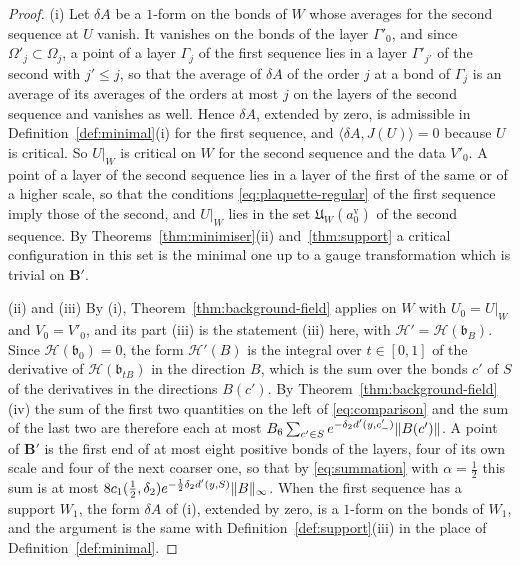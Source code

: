 \documentclass[11pt]{preprint}
\DeclarePairedDelimiter{\norm}{\lVert}{\rVert}
\numberwithin{equation}{section}
\begin{document}
\begin{proof}
(i) Let $\delta A$ be a $1$-form on the bonds of $W$ whose averages for the second sequence at $U$ vanish. It vanishes on the bonds of the layer $\Gamma'_0$, and since $\Omega'_j \subset \Omega_j$, a point of a layer $\Gamma_j$ of the first sequence lies in a layer $\Gamma'_{j'}$ of the second with $j' \leqslant j$, so that the average of $\delta A$ of the order $j$ at a bond of $\Gamma_j$ is an average of its averages of the orders at most $j$ on the layers of the second sequence and vanishes as well. Hence $\delta A$, extended by zero, is admissible in Definition~\ref{def:minimal}(i) for the first sequence, and $\langle\delta A, J(U)\rangle = 0$ because $U$ is critical. So $U|_W$ is critical on $W$ for the second sequence and the data $V'_0$. A point of a layer of the second sequence lies in a layer of the first of the same or of a higher scale, so that the conditions \eqref{eq:plaquette-regular} of the first sequence imply those of the second, and $U|_W$ lies in the set $\mathfrak U_W(a^{\mathrm v}_0)$ of the second sequence. By Theorems~\ref{thm:minimiser}(ii) and~\ref{thm:support} a critical configuration in this set is the minimal one up to a gauge transformation which is trivial on $\mathbf B'$.

(ii) and (iii) By (i), Theorem~\ref{thm:background-field} applies on $W$ with $U_0 = U|_W$ and $V_0 = V'_0$, and its part (iii) is the statement (iii) here, with $\mathcal H' = \mathcal H(\mathfrak b_B)$. Since $\mathcal H(\mathfrak b_0) = 0$, the form $\mathcal H'(B)$ is the integral over $t \in [0, 1]$ of the derivative of $\mathcal H(\mathfrak b_{tB})$ in the direction $B$, which is the sum over the bonds $c'$ of $S$ of the derivatives in the directions $B(c')$. By Theorem~\ref{thm:background-field}(iv) the sum of the first two quantities on the left of \eqref{eq:comparison} and the sum of the last two are therefore each at most $B_6\sum_{c' \in S}e^{-\delta_2d'(y, c'_-)}\norm{B(c')}$. A point of $\mathbf B'$ is the first end of at most eight positive bonds of the layers, four of its own scale and four of the next coarser one, so that by \eqref{eq:summation} with $\alpha = \frac{1}{2}$ this sum is at most $8c_1(\frac{1}{2}, \delta_2)e^{-\frac{1}{2}\delta_2d'(y, S)}\norm B_\infty$. When the first sequence has a support $W_1$, the form $\delta A$ of (i), extended by zero, is a $1$-form on the bonds of $W_1$, and the argument is the same with Definition~\ref{def:support}(iii) in the place of Definition~\ref{def:minimal}.
\end{proof}
\end{document}
